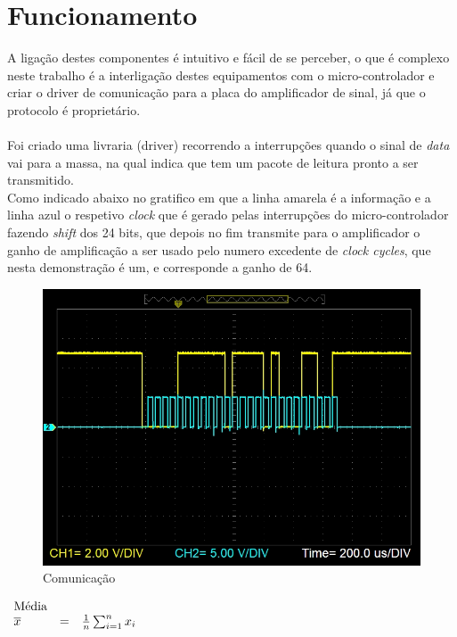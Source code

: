 \section{Funcionamento}
A ligação destes componentes é intuitivo e fácil de se perceber, o que é complexo neste trabalho é a interligação destes equipamentos com o micro-controlador e criar o driver de comunicação para a placa do amplificador de sinal, já que o protocolo é proprietário.\\
\\
Foi criado uma livraria (driver) recorrendo a interrupções quando o sinal de \textit{data} vai para a massa, na qual indica que tem um pacote de leitura pronto a ser transmitido.\\
Como indicado abaixo no gratifico em que a linha amarela é a informação e a linha azul o respetivo \textit{clock} que é gerado pelas interrupções do micro-controlador fazendo \textit{shift} dos 24 bits, que depois no fim transmite para o amplificador o ganho de amplificação a ser usado pelo numero excedente de \textit{clock cycles}, que nesta demonstração é um, e corresponde a ganho de 64.
\begin{figure}[H]
	\centering
	\includegraphics[scale=0.65]{./image/PESTA/graph/DataClkPacket_1.JPG}
	\caption{Comunicação}
	\label{DataClkPacket_1}
\end{figure}


$\begin{array}{l l l}
	\text{Média} & & \\
	\overline{x} & = & \frac{1}{n}\sum_{i=1}^n x_i
\end{array}$



